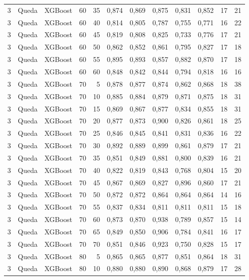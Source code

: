 \begin{longtable}{ccclrrrrrrrr}
3 & Queda & XGBoost & 60 & 35 & 0,874 & 0,869 & 0,875 & 0,831 & 0,852 & 17 & 21 \\
3 & Queda & XGBoost & 60 & 40 & 0,814 & 0,805 & 0,787 & 0,755 & 0,771 & 16 & 22 \\
3 & Queda & XGBoost & 60 & 45 & 0,819 & 0,808 & 0,825 & 0,733 & 0,776 & 17 & 21 \\
3 & Queda & XGBoost & 60 & 50 & 0,862 & 0,852 & 0,861 & 0,795 & 0,827 & 17 & 18 \\
3 & Queda & XGBoost & 60 & 55 & 0,895 & 0,893 & 0,857 & 0,882 & 0,870 & 17 & 18 \\
3 & Queda & XGBoost & 60 & 60 & 0,848 & 0,842 & 0,844 & 0,794 & 0,818 & 16 & 16 \\
3 & Queda & XGBoost & 70 & 5 & 0,878 & 0,877 & 0,874 & 0,862 & 0,868 & 18 & 38 \\
3 & Queda & XGBoost & 70 & 10 & 0,885 & 0,884 & 0,879 & 0,871 & 0,875 & 18 & 31 \\
3 & Queda & XGBoost & 70 & 15 & 0,869 & 0,867 & 0,877 & 0,834 & 0,855 & 18 & 31 \\
3 & Queda & XGBoost & 70 & 20 & 0,877 & 0,873 & 0,900 & 0,826 & 0,861 & 18 & 25 \\
3 & Queda & XGBoost & 70 & 25 & 0,846 & 0,845 & 0,841 & 0,831 & 0,836 & 16 & 22 \\
3 & Queda & XGBoost & 70 & 30 & 0,892 & 0,889 & 0,899 & 0,861 & 0,879 & 17 & 21 \\
3 & Queda & XGBoost & 70 & 35 & 0,851 & 0,849 & 0,881 & 0,800 & 0,839 & 16 & 21 \\
3 & Queda & XGBoost & 70 & 40 & 0,822 & 0,819 & 0,843 & 0,768 & 0,804 & 15 & 20 \\
3 & Queda & XGBoost & 70 & 45 & 0,867 & 0,869 & 0,827 & 0,896 & 0,860 & 17 & 21 \\
3 & Queda & XGBoost & 70 & 50 & 0,872 & 0,872 & 0,864 & 0,864 & 0,864 & 14 & 16 \\
3 & Queda & XGBoost & 70 & 55 & 0,837 & 0,834 & 0,811 & 0,811 & 0,811 & 15 & 18 \\
3 & Queda & XGBoost & 70 & 60 & 0,873 & 0,870 & 0,938 & 0,789 & 0,857 & 15 & 14 \\
3 & Queda & XGBoost & 70 & 65 & 0,849 & 0,850 & 0,906 & 0,784 & 0,841 & 16 & 17 \\
3 & Queda & XGBoost & 70 & 70 & 0,851 & 0,846 & 0,923 & 0,750 & 0,828 & 15 & 17 \\
3 & Queda & XGBoost & 80 & 5 & 0,865 & 0,865 & 0,877 & 0,851 & 0,864 & 18 & 31 \\
3 & Queda & XGBoost & 80 & 10 & 0,880 & 0,880 & 0,890 & 0,868 & 0,879 & 17 & 28 \\

\end{longtable}

